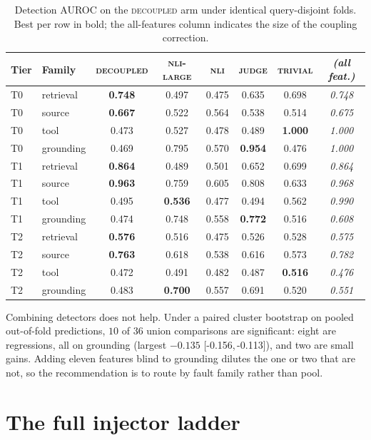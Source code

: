 \documentclass{article}
\newcommand{\ci}[2]{{\footnotesize[#1,\,#2]}}
\newcommand{\best}[1]{\textbf{#1}}
\begin{document}
\begin{table}[h]
\centering\small
\caption{Detection AUROC on the \textsc{decoupled} arm under identical query-disjoint folds.
Best per row in bold; the all-features column indicates the size of the coupling correction.}
\begin{tabular}{@{}llcccccc@{}}
\toprule
Tier & Family & \textsc{decoupled} & \textsc{nli-large} & \textsc{nli} & \textsc{judge} & \textsc{trivial} & \emph{(all feat.)} \\
\midrule
T0 & retrieval  & \best{0.748} & 0.497 & 0.475 & 0.635 & 0.698 & \emph{0.748} \\
T0 & source     & \best{0.667} & 0.522 & 0.564 & 0.538 & 0.514 & \emph{0.675} \\
T0 & tool       & 0.473 & 0.527 & 0.478 & 0.489 & \best{1.000} & \emph{1.000} \\
T0 & grounding  & 0.469 & 0.795 & 0.570 & \best{0.954} & 0.476 & \emph{1.000} \\
T1 & retrieval  & \best{0.864} & 0.489 & 0.501 & 0.652 & 0.699 & \emph{0.864} \\
T1 & source     & \best{0.963} & 0.759 & 0.605 & 0.808 & 0.633 & \emph{0.968} \\
T1 & tool       & 0.495 & \best{0.536} & 0.477 & 0.494 & 0.562 & \emph{0.990} \\
T1 & grounding  & 0.474 & 0.748 & 0.558 & \best{0.772} & 0.516 & \emph{0.608} \\
T2 & retrieval  & \best{0.576} & 0.516 & 0.475 & 0.526 & 0.528 & \emph{0.575} \\
T2 & source     & \best{0.763} & 0.618 & 0.538 & 0.616 & 0.573 & \emph{0.782} \\
T2 & tool       & 0.472 & 0.491 & 0.482 & 0.487 & \best{0.516} & \emph{0.476} \\
T2 & grounding  & 0.483 & \best{0.700} & 0.557 & 0.691 & 0.520 & \emph{0.551} \\
\bottomrule
\end{tabular}
\end{table}

Combining detectors does not help. Under a paired cluster bootstrap on pooled out-of-fold
predictions, $10$ of $36$ union comparisons are significant: eight are regressions, all on
grounding (largest $-0.135$ \ci{-0.156}{-0.113}), and two are small gains. Adding eleven
features blind to grounding dilutes the one or two that are not, so the recommendation is to
route by fault family rather than pool.

\section{The full injector ladder}
\label{app:ladder}
\end{document}
